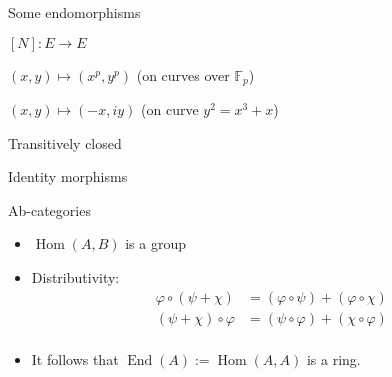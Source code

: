 \documentclass[aspectratio=169]{beamer}
\newcommand{\F}{\mathbb{F}}
\newcommand{\End}{\operatorname{End}}
\newcommand{\Hom}{\operatorname{Hom}}
\begin{document}

\begin{frame}{Some endomorphisms}
  \Large
  \begin{description}
    \setlength{\itemsep}{3em}
  \item[Scalar multiplication:] $[N] : E \to E$
  \item[Frobenius:] $(x,y) \mapsto (x^p, y^p)$ \hfill(on curves over $\F_p$)
  \item[Automorphisms:] $(x,y) \mapsto (-x, iy)$ \hfill(on curve $y^2 = x^3 + x$)
  \end{description}
\end{frame}


\begin{frame}{Transitively closed}
  \centering
\end{frame}


\begin{frame}{Identity morphisms}
  \centering
\end{frame}


\begin{frame}{Ab-categories}
  \large
  \begin{itemize}
    \setlength{\itemsep}{2em}
  \item $\Hom(A,B)$ is a group
  \item Distributivity:
    \begin{align*}
      φ∘(ψ+χ) &= (φ∘ψ)+(φ∘χ)\\[2em]
      (ψ+χ)∘φ &= (ψ∘φ)+(χ∘φ)\\
    \end{align*}
  \item It follows that \emph{$\End(A) := \Hom(A,A)$} is a ring.
  \end{itemize}
\end{frame}
\end{document}
